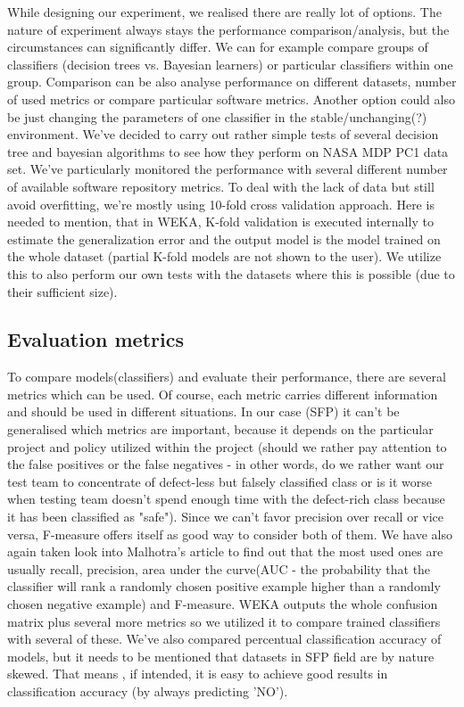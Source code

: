 While designing our experiment, we realised there are really lot of options. The nature of experiment always stays the performance comparison/analysis, but the circumstances can significantly differ. We can for example compare groups of classifiers (decision trees vs. Bayesian learners) or particular classifiers within one group. Comparison can be also analyse performance on different datasets, number of used metrics or compare particular software metrics. Another option could also be just changing the parameters of one classifier in the stable/unchanging(?) environment. We've decided to carry out rather simple tests of several decision tree and bayesian algorithms to see how they perform on NASA MDP PC1 data set. We've particularly monitored the performance with several different number of available software repository metrics. To deal with the lack of data but still avoid overfitting, we're mostly using 10-fold cross validation approach. Here is needed to mention, that in WEKA, K-fold validation is executed internally to estimate the generalization error and the output model is the model trained on the whole dataset (partial K-fold models are not shown to the user). We utilize this to also perform our own tests with the datasets where this is possible (due to their sufficient size).

\subsection{Evaluation metrics}
To compare models(classifiers) and evaluate their performance, there are several metrics which can be used. Of course, each metric carries different information and should be used in different situations. In our case (SFP) it can't be generalised which metrics are important, because it depends on the particular project and policy utilized within the project (should we rather pay attention to the false positives or the false negatives - in other words, do we rather want our test team to concentrate of defect-less but falsely classified class or is it worse when testing team doesn't spend enough time with the defect-rich class because it has been classified as "safe"). Since we can't favor precision over recall or vice versa, F-measure offers itself as good way to consider both of them. We have also again taken look into Malhotra's article\cite{malhotra2015systematic} to find out that the most used ones are usually recall, precision, area under the curve(AUC - the probability that the classifier will rank a randomly chosen positive example higher than a randomly chosen negative example\cite{japkowicz2011evaluating}) and F-measure. WEKA outputs the whole confusion matrix plus several more metrics so we utilized it to compare trained classifiers with several of these. We've also compared percentual classification accuracy of models, but it needs to be mentioned that datasets in SFP field are by nature skewed. That means , if intended, it is easy to achieve good results in classification accuracy (by always predicting 'NO').